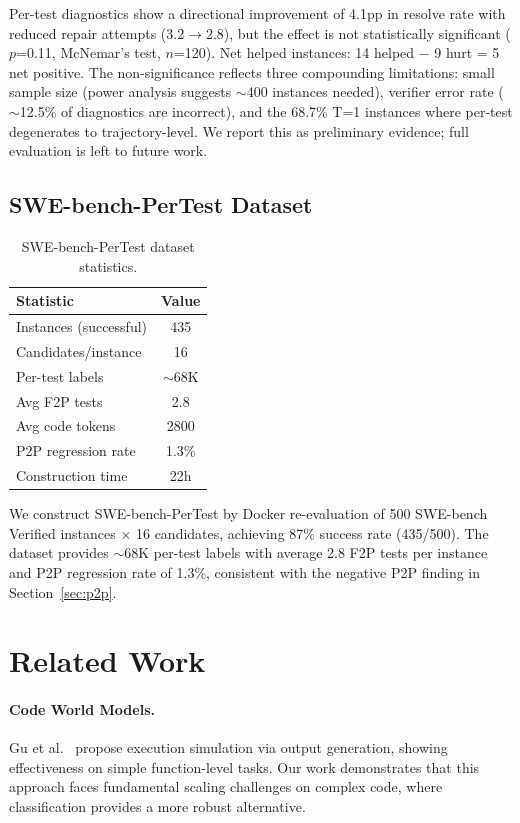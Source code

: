 \documentclass[11pt,a4paper]{article}
\begin{document}
Per-test diagnostics show a directional improvement of 4.1pp in resolve rate with reduced repair attempts (3.2$\to$2.8), but the effect is not statistically significant ($p$=0.11, McNemar's test, $n$=120). Net helped instances: 14 helped $-$ 9 hurt = 5 net positive. The non-significance reflects three compounding limitations: small sample size (power analysis suggests $\sim$400 instances needed), verifier error rate ($\sim$12.5\% of diagnostics are incorrect), and the 68.7\% T=1 instances where per-test degenerates to trajectory-level. We report this as preliminary evidence; full evaluation is left to future work.

\subsection{SWE-bench-PerTest Dataset}
\label{sec:dataset}

\begin{table}[h]
\centering
\caption{SWE-bench-PerTest dataset statistics.}
\label{tab:dataset}
\begin{tabular}{lc}
\toprule
Statistic & Value \\
\midrule
Instances (successful) & 435 \\
Candidates/instance & 16 \\
Per-test labels & $\sim$68K \\
Avg F2P tests & 2.8 \\
Avg code tokens & 2800 \\
P2P regression rate & 1.3\% \\
Construction time & 22h \\
\bottomrule
\end{tabular}
\end{table}

We construct SWE-bench-PerTest by Docker re-evaluation of 500 SWE-bench Verified instances $\times$ 16 candidates, achieving 87\% success rate (435/500). The dataset provides $\sim$68K per-test labels with average 2.8 F2P tests per instance and P2P regression rate of 1.3\%, consistent with the negative P2P finding in Section~\ref{sec:p2p}.

\section{Related Work}

\paragraph{Code World Models.} Gu et al.~\cite{gu2024self} propose execution simulation via output generation, showing effectiveness on simple function-level tasks. Our work demonstrates that this approach faces fundamental scaling challenges on complex code, where classification provides a more robust alternative.
\end{document}

